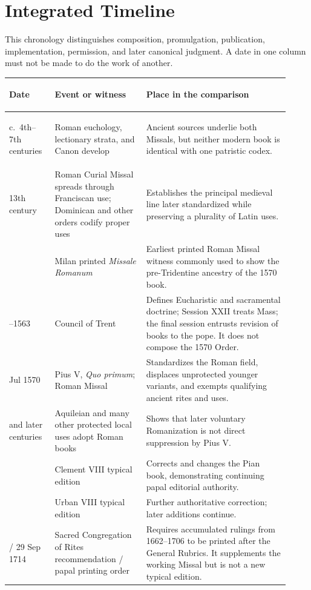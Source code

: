 \section{Integrated Timeline}

This chronology distinguishes composition, promulgation, publication, implementation, permission, and later canonical judgment. A date in one column must not be made to do the work of another.

\begin{longtable}{>{\bfseries\raggedright\arraybackslash}p{0.15\linewidth}>{\raggedright\arraybackslash}p{0.30\linewidth}>{\raggedright\arraybackslash}p{0.47\linewidth}}
\toprule
\textbf{Date} & \textbf{Event or witness} & \textbf{Place in the comparison}\\
\midrule
\endhead
c.~4th--7th centuries & Roman euchology, lectionary strata, and Canon develop & Ancient sources underlie both Missals, but neither modern book is identical with one patristic codex.\\
13th century & Roman Curial Missal spreads through Franciscan use; Dominican and other orders codify proper uses & Establishes the principal medieval line later standardized while preserving a plurality of Latin uses.\\
1474 & Milan printed \emph{Missale Romanum} & Earliest printed Roman Missal witness commonly used to show the pre-Tridentine ancestry of the 1570 book.\\
1545--1563 & Council of Trent & Defines Eucharistic and sacramental doctrine; Session XXII treats Mass; the final session entrusts revision of books to the pope. It does not compose the 1570 Order.\\
14 Jul 1570 & Pius V, \emph{Quo primum}; Roman Missal & Standardizes the Roman field, displaces unprotected younger variants, and exempts qualifying ancient rites and uses.\\
1596 and later centuries & Aquileian and many other protected local uses adopt Roman books & Shows that later voluntary Romanization is not direct suppression by Pius V.\\
1604 & Clement VIII typical edition & Corrects and changes the Pian book, demonstrating continuing papal editorial authority.\\
1634 & Urban VIII typical edition & Further authoritative correction; later additions continue.\\
15 / 29 Sep 1714 & Sacred Congregation of Rites recommendation / papal printing order & Requires accumulated rulings from 1662--1706 to be printed after the General Rubrics. It supplements the working Missal but is not a new typical edition.\\

\end{longtable}
